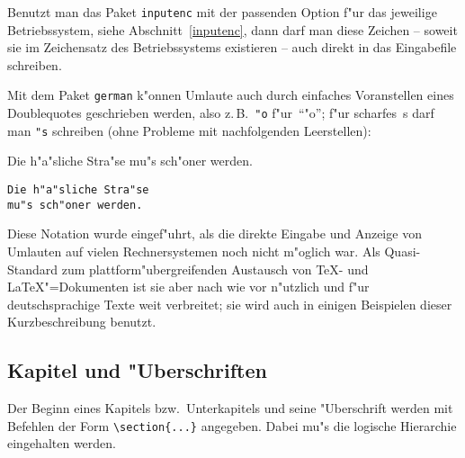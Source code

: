 Benutzt man das Paket \texttt{inputenc} mit der passenden Option
f"ur das jeweilige Betriebssystem, siehe Abschnitt~\ref{inputenc},
dann darf man diese Zeichen -- soweit sie im Zeichensatz des Betriebssystems
existieren -- auch direkt in das Eingabefile schreiben.

Mit dem Paket \texttt{german} %
k"onnen
Umlaute auch durch einfaches Voranstellen eines Doublequotes geschrieben werden, 
also z.\,B.\ \verb|"o| f"ur~"`"o"';
f"ur scharfes~s darf man \verb|"s| schreiben (ohne Probleme mit
nachfolgenden Leerstellen):
\exa
\begin{sloppypar} %
Die h"a"sliche Stra"se
mu"s sch"oner werden.
\end{sloppypar}
\exb
\begin{verbatim}
Die h"a"sliche Stra"se
mu"s sch"oner werden.
\end{verbatim}
\exc
Diese Notation wurde eingef"uhrt, als die direkte Eingabe und
Anzeige von Umlauten auf vielen Rechnersystemen noch nicht m"oglich war.
Als Quasi-Standard zum plattform\-"uber\-greifenden Austausch von 
\TeX- und \LaTeX"=Dokumenten ist sie aber nach wie vor n"utzlich und
f"ur deutschsprachige Texte weit verbreitet; sie wird auch in einigen 
Beispielen dieser Kurzbeschreibung benutzt.
 


\subsection{Kapitel und "Uberschriften}
 
Der Beginn eines Kapitels bzw.\ Unterkapitels und seine
"Uberschrift werden mit Befehlen der Form \verb|\section{...}|
angegeben. Dabei mu"s die logische Hierarchie eingehalten werden.

